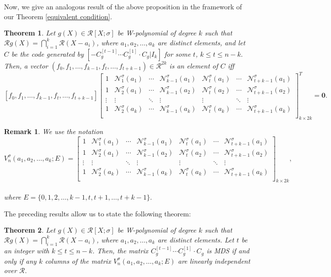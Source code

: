 \documentclass[11pt]{article}
\newtheorem{theorem}{Theorem}
\newtheorem{remark}{Remark}
\begin{document}
 Now, we give an analogous result of the above proposition  in the framework of our Theorem \ref{equivalent condition}.
 \begin{theorem}
	Let  $g( X )\in \mathcal{R}[X;\sigma]$ be W-polynomial of degree $k$ such that 	\(
\mathcal{R} g(X) = \bigcap_{i=1}^k \mathcal{R}(X - a_i)
\), where  $a_1,a_2,\dots ,a_{k}$ are distinct elements, and let \( C \) be the code generated by $[-C^{[t-1]}_g\cdots C^{[1]}_g\cdot C_g|I_k]$ for some $t$, $k\leq t\leq n-k.$ Then, a vector $(f_0,f_1,\dots,f_{k-1},f_t,\dots,f_{t+k-1})\in \mathcal{R}^{2k}$ is an element of $C$ iff $$[f_0,f_1,\dots,f_{k-1},f_t,\dots,f_{t+k-1}]{\begin{bmatrix}
1&\mathcal{N}^\sigma_1(a_1)&\cdots&\mathcal{N}^\sigma_{k-1}(a_1)&\mathcal{N}^\sigma_t(a_1)&\cdots&\mathcal{N}^\sigma_{t+k-1}(a_1)\\
1&\mathcal{N}^\sigma_2(a_1)&\cdots&\mathcal{N}^\sigma_{k-1}(a_2)&\mathcal{N}^\sigma_t(a_2)&\cdots&\mathcal{N}^\sigma_{t+k-1}(a_2)\\
\vdots&\vdots&\ddots&\vdots&\vdots&\ddots&\vdots\\
1&\mathcal{N}^\sigma_2(a_k)&\cdots&\mathcal{N}^\sigma_{k-1}(a_k)&\mathcal{N}^\sigma_t(a_k)&\cdots&\mathcal{N}^\sigma_{t+k-1}(a_k)\\
\end{bmatrix}^T_{k\times 2k}}=\textbf{0}.$$  
 \end{theorem}
\begin{remark}
    We use the notation$$V^{\sigma}_n(a_1,a_2,\dots,a_k;E)=\begin{bmatrix}
1&\mathcal{N}^\sigma_1(a_1)&\cdots&\mathcal{N}^\sigma_{k-1}(a_1)&\mathcal{N}^\sigma_t(a_1)&\cdots&\mathcal{N}^\sigma_{t+k-1}(a_1)\\
1&\mathcal{N}^\sigma_2(a_1)&\cdots&\mathcal{N}^\sigma_{k-1}(a_2)&\mathcal{N}^\sigma_t(a_2)&\cdots&\mathcal{N}^\sigma_{t+k-1}(a_2)\\
\vdots&\vdots&\ddots&\vdots&\vdots&\ddots&\vdots\\
1&\mathcal{N}^\sigma_2(a_k)&\cdots&\mathcal{N}^\sigma_{k-1}(a_k)&\mathcal{N}^\sigma_t(a_k)&\cdots&\mathcal{N}^\sigma_{t+k-1}(a_k)\\
\end{bmatrix}_{k\times 2k},$$\\ where $E=\{0,1,2,\dots,k-1,t,t+1,\dots,t+k-1\}.$
\end{remark}
The preceding results allow us to state the following theorem:
\begin{theorem}\label{Theroem 5}
	Let $g( X )\in \mathcal{R}[X;\sigma]$ be W-polynomial of degree $k$ such that 	\(
	\mathcal{R} g(X) = \bigcap_{i=1}^k \mathcal{R}(X - a_i)
	\), where  $a_1,a_2,\dots ,a_{k}$ are distinct elements. Let $t$ be an integer with $k\leq t \leq n-k$. Then, the matrix $C^{[t-1]}_g\cdots C^{[1]}_g\cdot C_g$ is MDS if and only if any $k$ columns of the matrix $ V^{\sigma}_n(a_1,a_2,\dots,a_k;E)$  are linearly independent over $\mathcal{R}.$ 
\end{theorem}
\end{document}
